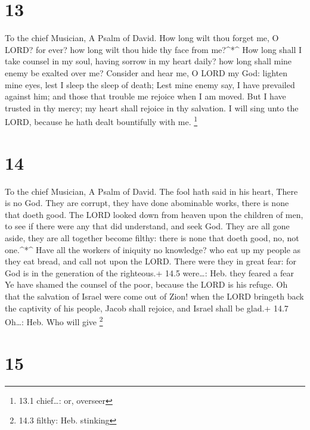 \hypertarget{section-12}{%
\section{13}\label{section-12}}

To the chief Musician, A Psalm of David.  How long wilt thou
forget me, O LORD? for ever? how long wilt thou hide thy face from
me?\^{}*\^{}  How long shall I take counsel in my soul,
having sorrow in my heart daily? how long shall mine enemy be exalted
over me?  Consider and hear me, O LORD my God: lighten mine
eyes, lest I sleep the sleep of death;  Lest mine enemy say,
I have prevailed against him; and those that trouble me rejoice when I
am moved.  But I have trusted in thy mercy; my heart shall
rejoice in thy salvation.  I will sing unto the LORD,
because he hath dealt bountifully with me. \footnote{13.1 chief\ldots:
  or, overseer}

\hypertarget{section-13}{%
\section{14}\label{section-13}}

To the chief Musician, A Psalm of David.  The fool hath said
in his heart, There is no God. They are corrupt, they have done
abominable works, there is none that doeth good.  The LORD
looked down from heaven upon the children of men, to see if there were
any that did understand, and seek God.  They are all gone
aside, they are all together become filthy: there is none that doeth
good, no, not one.\^{}*\^{}  Have all the workers of
iniquity no knowledge? who eat up my people as they eat bread, and call
not upon the LORD.  There were they in great fear: for God
is in the generation of the righteous.+ 14.5 were\ldots: Heb. they
feared a fear  Ye have shamed the counsel of the poor,
because the LORD is his refuge.  Oh that the salvation of
Israel were come out of Zion! when the LORD bringeth back the captivity
of his people, Jacob shall rejoice, and Israel shall be glad.+ 14.7
Oh\ldots: Heb. Who will give \footnote{14.3 filthy: Heb. stinking}

\hypertarget{section-14}{%
\section{15}\label{section-14}}

